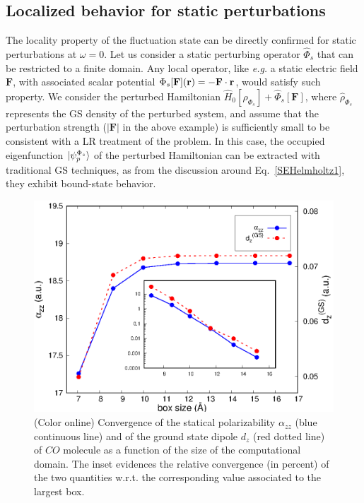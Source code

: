 \documentclass[reprint,aps,prb]{revtex4-1}
\renewcommand{\r}{{\bf r}}
\newcommand{\op}[1]{\hat {#1}}
\newcommand{\dm}{\op{\rho}}
\newcommand{\hnot}{\op{H}_0}
\begin{document}
\subsection{Localized behavior for static perturbations}
The locality property of the fluctuation state can be directly confirmed for static perturbations at $\omega=0$.
Let us consider a static perturbing operator $\op\Phi_s$ that can be restricted to a finite domain.
Any local operator, like \emph{e.g.} a static electric field $\mathbf F$, with associated scalar potential $\Phi_s[\mathbf F](\r) = -\mathbf F \cdot \r$, would satisfy such property.
We consider the perturbed Hamiltonian $\hnot[\dm_{\Phi_s}] + \op\Phi_s[\mathbf F]$, where $\dm_{\Phi_s}$ represents the GS density of the perturbed system, and assume that the
perturbation strength ($|\mathbf F|$ in the above example) is sufficiently small to be consistent with a LR treatment of the problem.
In this case, the occupied eigenfunction $\ket{\psi_p^{\Phi_s}}$ of the perturbed Hamiltonian can be extracted with traditional GS techniques,
as from the discussion around Eq.~\eqref{SEHelmholtz1}, they exhibit bound-state behavior.
\begin{figure}[t]
\includegraphics[scale=0.68]{Fig1_CO_statPolvsBox.eps}
\caption{\label{co_alphaStatic}(Color online) Convergence of the statical polarizability $\alpha_{zz}$ (blue continuous line) and of the ground state dipole $d_z$ (red dotted line)
of $CO$ molecule as a function of the size of the computational domain. The inset evidences the relative convergence (in percent) of the two quantities w.r.t. the corresponding value associated to the largest
box.}
\end{figure}
\end{document}

